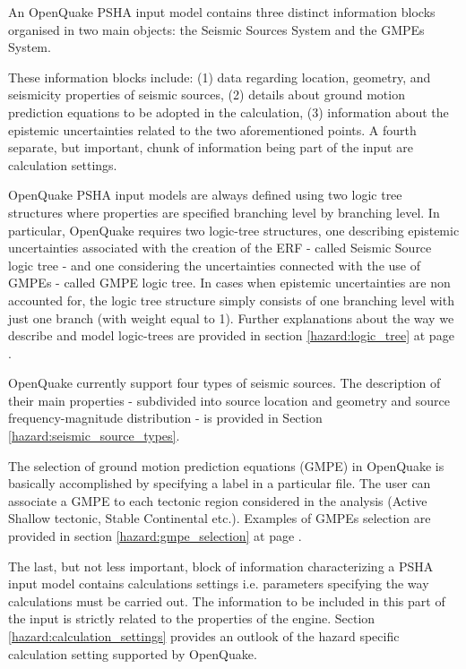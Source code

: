 An OpenQuake PSHA input model contains three distinct information blocks organised 
in two main objects: the Seismic Sources System and the GMPEs System. 

These information blocks include: (1) data regarding location, geometry, and 
seismicity properties of seismic sources, (2) details about ground motion 
prediction equations to be  adopted in the calculation, (3) information about 
the epistemic uncertainties related to the two aforementioned points. A fourth 
separate, but important, chunk of information being part of the input are 
calculation settings.

OpenQuake PSHA input models are always defined using two logic tree structures 
where properties are specified branching level by branching level. In particular,
OpenQuake requires two logic-tree structures, one describing epistemic uncertainties 
associated with the creation of the ERF - called Seismic Source logic tree - 
and one considering the uncertainties connected with the use of GMPEs - called GMPE logic tree. 
In cases when epistemic uncertainties are non accounted for, the logic tree structure simply consists of one branching level with just one branch (with weight equal to 1).
%
Further explanations about the way we describe and model logic-trees are provided in section \ref{hazard:logic_tree} at page \pageref{hazard:logic_tree}. 

OpenQuake currently support four types of seismic sources. The description of their main properties - subdivided into source location and geometry and source frequency-magnitude distribution - is provided in Section \ref{hazard:seismic_source_types}. 

The selection of ground motion prediction equations (GMPE) in OpenQuake 
is basically accomplished by specifying a label in a particular file.  
The user can associate a GMPE to each tectonic region considered in the 
analysis (Active Shallow tectonic, Stable Continental etc.). Examples of 
GMPEs selection are provided in section \ref{hazard:gmpe_selection} at page 
\pageref{hazard:gmpe_selection}.

The last, but not less important, block of information characterizing a PSHA 
input model contains calculations settings i.e. parameters specifying the way calculations must be carried out. 
%
The information to be included in this part of the input is strictly related to the properties of the engine. 
%
Section \ref{hazard:calculation_settings} provides an outlook of the hazard specific calculation setting supported by OpenQuake. 
%

%

%
